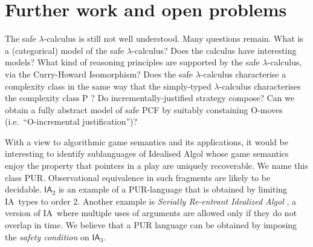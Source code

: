 \documentclass{llncs}
\newcommand\ialgol{\textsf{IA}}
\begin{document}



\section{Further work and open problems}

The safe $\lambda$-calculus is still not well understood. Many
questions remain. What is a (categorical) model of the safe
$\lambda$-calculus? Does the calculus have interesting models?  What
kind of reasoning principles are supported by the safe
$\lambda$-calculus, via the Curry-Howard Isomorphism? Does the safe
$\lambda$-calculus characterise a complexity class in the same way
that the simply-typed $\lambda$-calculus characterises the complexity
class P \cite{DBLP:conf/tlca/LeivantM93}?  Do incrementally-justified
strategy compose? Can we obtain a fully abstract model of safe PCF by
suitably constaining O-moves (i.e.~``O-incremental justification'')?

With a view to algorithmic game semantics and its applications, it
would be interesting to identify sublanguages of Idealised Algol whose
game semantics enjoy the property that pointers in a play are uniquely
recoverable. We name this class PUR. Observational equivalence in such
fragments are likely to be decidable. $\ialgol_2$ is an example of a
PUR-language that is obtained by limiting \ialgol\ types to order
$2$. Another example is \emph{Serially Re-entrant Idealized Algol}
\cite{abramsky:mchecking_ia}, a version of \ialgol\ where multiple
uses of arguments are allowed only if they do not overlap in time.  We
believe that a PUR language can be obtained by imposing the
\emph{safety condition} on $\ialgol_3$.
\end{document}

